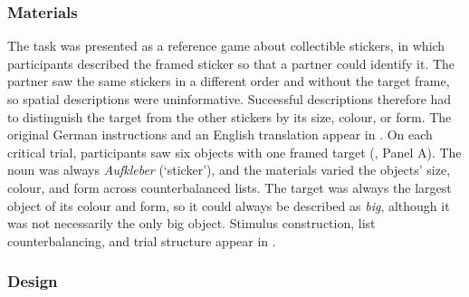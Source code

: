 \documentclass[10pt,a4paper,fleqn]{article}
\begin{document}
\subsubsection{Materials}

The task was presented as a reference game about collectible stickers, in which participants described the framed sticker so that a partner could identify it.
The partner saw the same stickers in a different order and without the target frame, so spatial descriptions were uninformative.
Successful descriptions therefore had to distinguish the target from the other stickers by its size, colour, or form.
The original German instructions and an English translation appear in .
On each critical trial, participants saw six objects with one framed target (, Panel A).
The noun was always \emph{Aufkleber} (`sticker'), and the materials varied the objects' size, colour, and form across counterbalanced lists.
The target was always the largest object of its colour and form, so it could always be described as \emph{big}, although it was not necessarily the only big object.
Stimulus construction, list counterbalancing, and trial structure appear in .

\subsubsection{Design}
\end{document}
